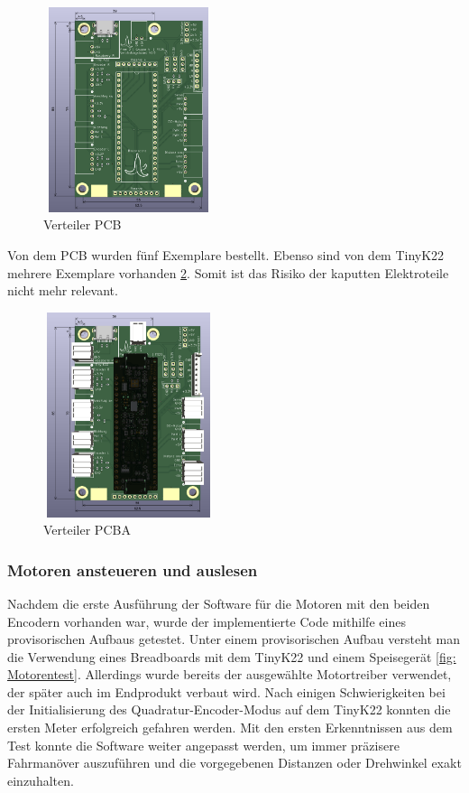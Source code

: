 \begin{figure}[H]
\centering
\includegraphics[width=5cm, height=6cm]{assets/ET/PCB/VerteilerPCB_unbestueckt.png}
\caption{Verteiler PCB}
\label{fig: Verteiler PCB}
\end{figure}

Von dem PCB wurden fünf Exemplare bestellt. Ebenso sind von dem TinyK22 mehrere Exemplare vorhanden \ref{fig: Verteiler PCBA}. Somit ist das Risiko der kaputten Elektroteile nicht mehr relevant.

\begin{figure}[H]
\centering
\includegraphics[width=5cm, height=6cm]{assets/ET/PCB/VerteilerPCB_bestueckt.png}
\caption{Verteiler PCBA}
\label{fig: Verteiler PCBA}
\end{figure}



\subsubsection{Motoren ansteueren und auslesen}

Nachdem die erste Ausführung der Software für die Motoren mit den beiden Encodern vorhanden war, wurde der implementierte Code mithilfe eines provisorischen Aufbaus getestet. Unter einem provisorischen Aufbau versteht man die Verwendung eines Breadboards mit dem TinyK22 und einem Speisegerät \ref{fig: Motorentest}. Allerdings wurde bereits der ausgewählte Motortreiber verwendet, der später auch im Endprodukt verbaut wird. Nach einigen Schwierigkeiten bei der Initialisierung des Quadratur-Encoder-Modus auf dem TinyK22 konnten die ersten Meter erfolgreich gefahren werden. Mit den ersten Erkenntnissen aus dem Test konnte die Software weiter angepasst werden, um immer präzisere Fahrmanöver auszuführen und die vorgegebenen Distanzen oder Drehwinkel exakt einzuhalten.


